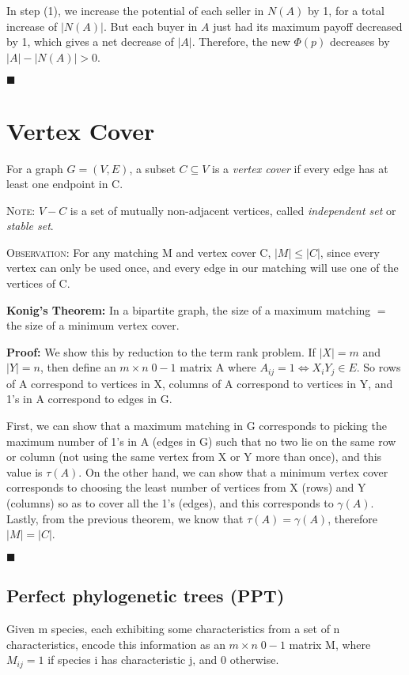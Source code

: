 \documentclass[11pt, letterpaper, oneside]{article}
\begin{document}
In step (1), we increase the potential of each seller in $N(A)$ by 1, for a total increase of $|N(A)|$. But each buyer in $A$ just had its maximum payoff decreased by 1, which gives a net decrease of $|A|$. Therefore, the new $\Phi(p)$ decreases by $|A|-|N(A)|>0$.

{\hfill $\blacksquare$}


\section{Vertex Cover}

For a graph $G = (V,E)$, a subset $C \subseteq V$ is a \textit{vertex cover} if every edge has at least one endpoint in C.

\textsc{Note:} $V-C$ is a set of mutually non-adjacent vertices, called \textit{independent set} or \textit{stable set}.

\textsc{Observation:} For any matching M and vertex cover C, $|M| \leq |C|$, since every vertex can only be used once, and every edge in our matching will use one of the vertices of C.

\textbf{Konig's Theorem:} In a bipartite graph, the size of a maximum matching $=$ the size of a minimum vertex cover.

\textbf{Proof:} We show this by reduction to the term rank problem. If $|X|=m$ and $|Y|=n$, then define an $m 
\times n \; 0-1$ matrix A where $A_{ij} = 1 \Leftrightarrow X_i Y_j \in E$. So rows of A correspond to vertices in X, columns of A correspond to vertices in Y, and 1's in A correspond to edges in G.

First, we can show that a maximum matching in G corresponds to picking the maximum number of 1's in A (edges in G) such that no two lie on the same row or column (not using the same vertex from X or Y more than once), and this value is $\tau(A)$. On the other hand, we can show that a minimum vertex cover corresponds to choosing the least number of vertices from X (rows) and Y (columns) so as to cover all the 1's (edges), and this corresponds to $\gamma(A)$. Lastly, from the previous theorem, we know that $\tau(A)=\gamma(A)$, therefore $|M|=|C|$.

{\hfill $\blacksquare$}

\subsection{Perfect phylogenetic trees (PPT)}

Given m species, each exhibiting some characteristics from a set of n characteristics, encode this information as an $m \times n \; 0-1$ matrix M, where $M_{ij}=1$ if species i has characteristic j, and 0 otherwise.
\end{document}
